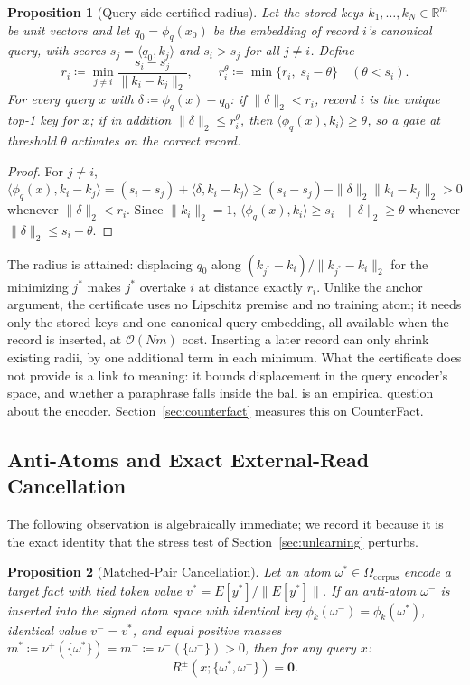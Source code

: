 \documentclass[preprint,12pt]{elsarticle}
\newtheorem{proposition}{Proposition}
\newcommand{\R}{\mathbb{R}}
\newcommand{\Om}{\Omega}
\newcommand{\rev}[1]{#1}
\begin{document}
\begin{proposition}[Query-side certified radius]
\label{prop:query_radius}
\rev{Let the stored keys $k_1,\dots,k_N\in\R^m$ be unit vectors and let $q_0=\phi_q(x_0)$ be the embedding of record $i$'s canonical query, with scores $s_j=\langle q_0,k_j\rangle$ and $s_i>s_j$ for all $j\ne i$. Define
\[
  r_i \coloneqq \min_{j\ne i}\frac{s_i-s_j}{\|k_i-k_j\|_2}, \qquad r_i^{\theta}\coloneqq\min\{r_i,\; s_i-\theta\}\quad(\theta<s_i).
\]
For every query $x$ with $\delta\coloneqq\phi_q(x)-q_0$: if $\|\delta\|_2<r_i$, record $i$ is the unique top-1 key for $x$; if in addition $\|\delta\|_2\le r_i^{\theta}$, then $\langle\phi_q(x),k_i\rangle\ge\theta$, so a gate at threshold $\theta$ activates on the correct record.}
\end{proposition}

\begin{proof}
\rev{For $j\ne i$, $\langle\phi_q(x),k_i-k_j\rangle=(s_i-s_j)+\langle\delta,k_i-k_j\rangle\ge(s_i-s_j)-\|\delta\|_2\|k_i-k_j\|_2>0$ whenever $\|\delta\|_2<r_i$. Since $\|k_i\|_2=1$, $\langle\phi_q(x),k_i\rangle\ge s_i-\|\delta\|_2\ge\theta$ whenever $\|\delta\|_2\le s_i-\theta$.} \qedhere
\end{proof}

\rev{The radius is attained: displacing $q_0$ along $(k_{j^*}-k_i)/\|k_{j^*}-k_i\|_2$ for the minimizing $j^*$ makes $j^*$ overtake $i$ at distance exactly $r_i$. Unlike the anchor argument, the certificate uses no Lipschitz premise and no training atom; it needs only the stored keys and one canonical query embedding, all available when the record is inserted, at $\mathcal O(Nm)$ cost. Inserting a later record can only shrink existing radii, by one additional term in each minimum. What the certificate does not provide is a link to meaning: it bounds displacement in the query encoder's space, and whether a paraphrase falls inside the ball is an empirical question about the encoder. Section~\ref{sec:counterfact} measures this on CounterFact.}

\subsection{Anti-Atoms and Exact External-Read Cancellation}

The following observation is algebraically immediate; we record it because it is the exact identity that the stress test of Section~\ref{sec:unlearning} perturbs.

\begin{proposition}[Matched-Pair Cancellation]
\label{prop:unlearning}
Let an atom $\omega^* \in \Om_{\mathrm{corpus}}$ encode a target fact with tied token value $v^* = E[y^*] / \|E[y^*]\|$. If an anti-atom $\omega^-$ is inserted into the signed atom space with identical key $\phi_k(\omega^-) = \phi_k(\omega^*)$, identical value $v^- = v^*$, and equal positive masses $m^* \coloneqq \nu^+(\{\omega^*\}) = m^- \coloneqq \nu^-(\{\omega^-\}) > 0$, then for any query $x$:
\[
  R^{\pm}(x; \{\omega^*, \omega^-\}) = \mathbf{0}.
\]
\end{proposition}
\end{document}
